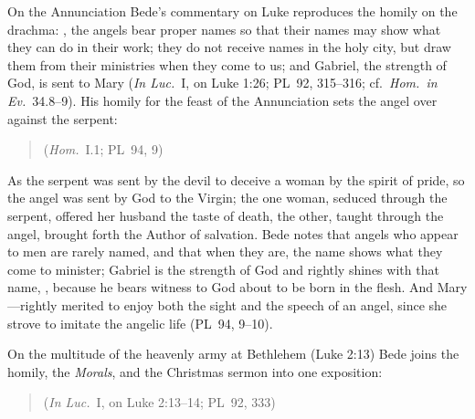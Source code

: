 On the Annunciation Bede's commentary on Luke reproduces the homily on the
drachma: , the angels bear proper names so
that their names may show what they can do in their work; they do not
receive names in the holy city, but draw them from their ministries when
they come to us; and Gabriel, the strength of God, is sent to Mary
(\emph{In Luc.}\ I, on Luke 1:26; PL~92, 315--316; cf.\ \emph{Hom.\ in
Ev.}\ 34.8--9). His homily for the feast of the Annunciation sets the
angel over against the serpent:

\begin{quote}
 (\emph{Hom.}\ I.1; PL~94, 9)
\end{quote}

\noindent As the serpent was sent by the devil to deceive a woman by the
spirit of pride, so the angel was sent by God to the Virgin; the one woman,
seduced through the serpent, offered her husband the taste of death, the
other, taught through the angel, brought forth the Author of salvation. Bede
notes that angels who appear to men are rarely named, and that when they
are, the name shows what they come to minister; Gabriel is the strength of
God and rightly shines with that name, , because he bears witness to God about to be born in
the flesh. And Mary ---rightly merited to enjoy
both the sight and the speech of an angel, since she strove to imitate the
angelic life (PL~94, 9--10).

On the multitude of the heavenly army at Bethlehem (Luke 2:13) Bede joins
the homily, the \emph{Morals}, and the Christmas sermon into one exposition:

\begin{quote}
 (\emph{In Luc.}\ I, on Luke 2:13--14; PL~92,
333)
\end{quote}

